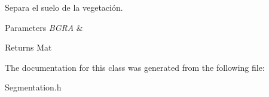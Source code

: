 Separa el suelo de la vegetación. 


\begin{DoxyParams}{Parameters}
{\em B\+G\+RA} & \\
\hline
\end{DoxyParams}
\begin{DoxyReturn}{Returns}
Mat 
\end{DoxyReturn}


The documentation for this class was generated from the following file\+:\begin{DoxyCompactItemize}
\item 
Segmentation.\+h\end{DoxyCompactItemize}
